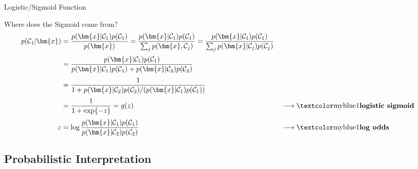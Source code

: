 \begin{frame}{Logistic/Sigmoid Function}{}
\end{frame}


\begin{frame}{Where does the Sigmoid come from?}{}\optional
	{\footnotesize
	\begin{alignat*}{2}
		p(\mathcal{C}_1 \vert \bm{x})
			&=	\frac{p(\bm{x} \vert \mathcal{C}_1) p(\mathcal{C}_1)}{p(\bm{x})}
				= \frac{p(\bm{x} \vert \mathcal{C}_1) p(\mathcal{C}_1)}{\sum_j p(\bm{x}, \mathcal{C}_j)}
				= \frac{p(\bm{x} \vert \mathcal{C}_1) p(\mathcal{C}_1)}{\sum_j p(\bm{x} \vert \mathcal{C}_j) p(\mathcal{C}_j)}
			\\[1mm]
			&= \frac{p(\bm{x} \vert \mathcal{C}_1) p(\mathcal{C}_1)}{
				p(\bm{x} \vert \mathcal{C}_1) p(\mathcal{C}_1) + p(\bm{x} \vert \mathcal{C}_2) p(\mathcal{C}_2)}
			\\[1mm]
			&= \frac{1}{1 + p(\bm{x} \vert \mathcal{C}_2) p(\mathcal{C}_2) / (p(\bm{x} \vert \mathcal{C}_1) p(\mathcal{C}_1))}
			\\[1mm]
			&= \frac{1}{1 + \exp\{ -z \}} = g(z) && \longrightarrow \text{\highlight{logistic sigmoid}}
			\\[1mm]
		z 	&= \log \frac{p(\bm{x} \vert \mathcal{C}_1) p(\mathcal{C}_1)}{p(\bm{x} \vert \mathcal{C}_2) p(\mathcal{C}_2)}
			&& \longrightarrow \text{\highlight{log odds}}
	\end{alignat*}}
\end{frame}


\subsection{Probabilistic Interpretation}

